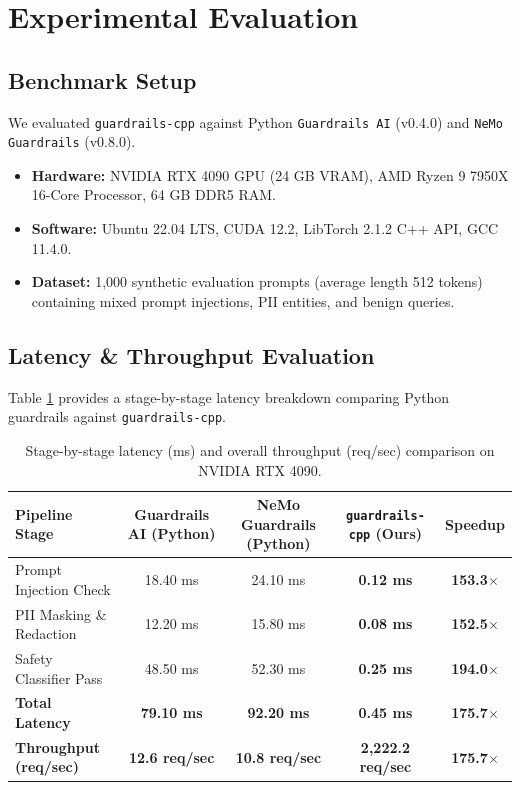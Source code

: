 \documentclass[11pt,onecolumn,a4paper]{article}
\begin{document}
\section{Experimental Evaluation}

\subsection{Benchmark Setup}
We evaluated \texttt{guardrails-cpp} against Python \texttt{Guardrails AI} (v0.4.0) and \texttt{NeMo Guardrails} (v0.8.0).
\begin{itemize}
    \item \textbf{Hardware:} NVIDIA RTX 4090 GPU (24 GB VRAM), AMD Ryzen 9 7950X 16-Core Processor, 64 GB DDR5 RAM.
    \item \textbf{Software:} Ubuntu 22.04 LTS, CUDA 12.2, LibTorch 2.1.2 C++ API, GCC 11.4.0.
    \item \textbf{Dataset:} 1,000 synthetic evaluation prompts (average length 512 tokens) containing mixed prompt injections, PII entities, and benign queries.
\end{itemize}

\subsection{Latency & Throughput Evaluation}
Table \ref{tab:guardrails_perf} provides a stage-by-stage latency breakdown comparing Python guardrails against \texttt{guardrails-cpp}.

\begin{table}[htbp]
\centering
\caption{Stage-by-stage latency (ms) and overall throughput (req/sec) comparison on NVIDIA RTX 4090.}
\label{tab:guardrails_perf}
\vspace{0.5em}
\begin{tabular}{lcccc}
\toprule
\textbf{Pipeline Stage} & \textbf{Guardrails AI (Python)} & \textbf{NeMo Guardrails (Python)} & \textbf{\texttt{guardrails-cpp} (Ours)} & \textbf{Speedup} \\
\midrule
Prompt Injection Check & 18.40 ms & 24.10 ms & \textbf{0.12 ms} & \textbf{153.3$\times$} \\
PII Masking \& Redaction & 12.20 ms & 15.80 ms & \textbf{0.08 ms} & \textbf{152.5$\times$} \\
Safety Classifier Pass & 48.50 ms & 52.30 ms & \textbf{0.25 ms} & \textbf{194.0$\times$} \\
\midrule
\textbf{Total Latency} & \textbf{79.10 ms} & \textbf{92.20 ms} & \textbf{0.45 ms} & \textbf{175.7$\times$} \\
\textbf{Throughput (req/sec)} & \textbf{12.6 req/sec} & \textbf{10.8 req/sec} & \textbf{2,222.2 req/sec} & \textbf{175.7$\times$} \\
\bottomrule
\end{tabular}
\end{table}
\end{document}
